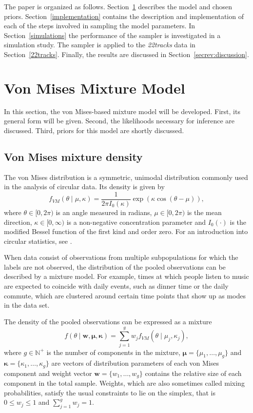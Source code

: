 The paper is organized as follows. Section~\ref{design} describes the model and chosen priors. Section~\ref{implementation} contains the description and implementation of each of the steps involved in sampling the model parameters. In Section~\ref{simulations} the performance of the sampler is investigated in a simulation study. The sampler is applied to the \textit{22tracks} data in Section~\ref{22tracks}. Finally, the results are discussed in Section~\ref{secrev:discussion}.


\section{Von Mises Mixture Model}
\label{design}

In this section, the von Mises-based mixture model will be developed. First, its general form will be given. Second, the likelihoods necessary for inference are discussed. Third, priors for this model are shortly discussed. 

\subsection{Von Mises mixture density}

The von Mises distribution is a symmetric, unimodal distribution commonly used in the analysis of circular data. Its density is given by
\begin{equation}
f_{VM}(\theta\mid\mu,\kappa) = \frac{1}{2\pi I_0(\kappa)} \exp({\kappa\cos(\theta-\mu)}),
\end{equation}
where $\theta \in \mathopen[ 0, 2\pi \mathclose)$ is an angle measured in radians, $\mu \in \mathopen[ 0, 2\pi \mathclose)$ is the mean direction, $\kappa \in \mathopen[ 0, \infty \mathclose)$ is a non-negative concentration parameter and $I_0(\cdot)$ is the modified Bessel function of the first kind and order zero. For an introduction into circular statistics, see \citep{Mardia2009}.

When data consist of observations from multiple subpopulations for which the labels are not observed, the distribution of the pooled observations can be described by a mixture model. For example, times at which people listen to music are expected to coincide with daily events, such as dinner time or the daily commute, which are clustered around certain time points that show up as modes in the data set. 

The density of the pooled observations can be expressed as a mixture
\begin{equation}
f(\theta\mid\bm{w},\bm{\mu},\bm{\kappa}) = \sum_{j=1}^{g} w_j f_{VM}(\theta\mid\mu_j,\kappa_j),
\end{equation}
where $g \in \mathbb{N}^+$ is the number of components in the mixture, $\bm{\mu}=\{\mu_1,\dotsc,\mu_g\}$ and $\bm{\kappa}=\{\kappa_1,\dotsc,\kappa_g\}$ are vectors of distribution parameters of each von Mises component and weight vector $\bm{w}=\{w_1,\dotsc,w_g\}$ contains the relative size of each component in the total sample. Weights, which are also sometimes called mixing probabilities, satisfy the usual constraints to lie on the simplex, that is $0 \leq w_j \leq 1$ and $\sum^{g}_{j=1}w_j=1$. 


